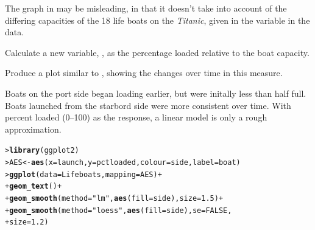 \documentclass[10pt]{report}\usepackage[]{graphicx}\usepackage[]{color}
\makeatletter
\newcommand{\hlnum}[1]{\textcolor[rgb]{0.686,0.059,0.569}{#1}}%
\newcommand{\hlstr}[1]{\textcolor[rgb]{0.192,0.494,0.8}{#1}}%
\newcommand{\hlopt}[1]{\textcolor[rgb]{0,0,0}{#1}}%
\newcommand{\hlstd}[1]{\textcolor[rgb]{0.345,0.345,0.345}{#1}}%
\newcommand{\hlkwb}[1]{\textcolor[rgb]{0.69,0.353,0.396}{#1}}%
\newcommand{\hlkwc}[1]{\textcolor[rgb]{0.333,0.667,0.333}{#1}}%
\newcommand{\hlkwd}[1]{\textcolor[rgb]{0.737,0.353,0.396}{\textbf{#1}}}%
\newenvironment{kframe}{%
 \def\at@end@of@kframe{}%
 \ifinner\ifhmode%
  \def\at@end@of@kframe{\end{minipage}}%
  \begin{minipage}{\columnwidth}%
 \fi\fi%
 \def\FrameCommand##1{\hskip\@totalleftmargin \hskip-\fboxsep
 \colorbox{shadecolor}{##1}\hskip-\fboxsep
     \hskip-\linewidth \hskip-\@totalleftmargin \hskip\columnwidth}%
 \MakeFramed {\advance\hsize-\width
   \@totalleftmargin\z@ \linewidth\hsize
   \@setminipage}}%
 {\par\unskip\endMakeFramed%
 \at@end@of@kframe}
\newenvironment{knitrout}{}{} %
\renewenvironment{knitrout}{\small\renewcommand{\baselinestretch}{.85}}{} %
\makeatother
\begin{document}
\begin{Exercises}
\begin{enumerate*}
    \end{enumerate*}

  \exercise The graph in  may be misleading, in that it doesn't
  take into account of the differing capacities of the 18 life boats on the
  \emph{Titanic}, given in the variable  in the  data.
    \begin{enumerate*}
      \item Calculate a new variable, , as the percentage
      loaded relative to the boat capacity.
      
      \item Produce a plot similar to , showing the
      changes over time in this measure.
      \begin{ans}
      Boats on the port side began loading earlier, but were initally less than
      half full.  Boats launched from the starbord side were more consistent over time.
      With percent loaded (0--100) as the response, a linear model is only
      a rough approximation.
\begin{knitrout}\footnotesize
{}\color{fgcolor}\begin{kframe}
\begin{alltt}
\hlstd{> }\hlkwd{library}\hlstd{(ggplot2)}
\hlstd{> }\hlstd{AES} \hlkwb{<-} \hlkwd{aes}\hlstd{(}\hlkwc{x} \hlstd{= launch,} \hlkwc{y} \hlstd{= pctloaded,} \hlkwc{colour} \hlstd{= side,} \hlkwc{label} \hlstd{= boat)}
\hlstd{> }\hlkwd{ggplot}\hlstd{(}\hlkwc{data} \hlstd{= Lifeboats,} \hlkwc{mapping} \hlstd{= AES)} \hlopt{+}
\hlstd{+ }     \hlkwd{geom_text}\hlstd{()} \hlopt{+}
\hlstd{+ }     \hlkwd{geom_smooth}\hlstd{(}\hlkwc{method} \hlstd{=} \hlstr{"lm"}\hlstd{,} \hlkwd{aes}\hlstd{(}\hlkwc{fill} \hlstd{= side),} \hlkwc{size} \hlstd{=} \hlnum{1.5}\hlstd{)} \hlopt{+}
\hlstd{+ }     \hlkwd{geom_smooth}\hlstd{(}\hlkwc{method} \hlstd{=} \hlstr{"loess"}\hlstd{,} \hlkwd{aes}\hlstd{(}\hlkwc{fill} \hlstd{= side),} \hlkwc{se} \hlstd{=} \hlnum{FALSE}\hlstd{,}
\hlstd{+ }                 \hlkwc{size} \hlstd{=} \hlnum{1.2}\hlstd{)}
\end{alltt}
\end{kframe}


\end{knitrout}
\end{ans}
\end{enumerate*}
\end{Exercises}
\end{document}
